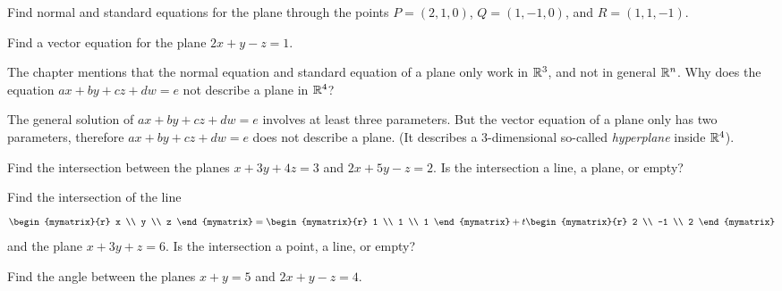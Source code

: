 \begin{ex}
  Find normal and standard equations for the plane through the points
  $P = (2,1,0)$, $Q=(1,-1,0)$, and $R=(1,1,-1)$.
\end{ex}

\begin{ex}
  Find a vector equation for the plane $2x+y-z=1$.
\end{ex}

\begin{ex}
  The chapter mentions that the normal equation and standard equation
  of a plane only work in $\mathbb{R}^3$, and not in general $\mathbb{R}^n$. Why does
  the equation $ax+by+cz+dw=e$ not describe a plane in $\mathbb{R}^4$?
  \begin{sol}
    The general solution of $ax+by+cz+dw=e$ involves at least three
    parameters.  But the vector equation of a plane only has two
    parameters, therefore $ax+by+cz+dw=e$ does not describe a
    plane. (It describes a $3$-dimensional so-called {\em
      hyperplane} inside
    $\mathbb{R}^4$).
  \end{sol}
\end{ex}

\begin{ex}
  Find the intersection between the planes $x+3y+4z=3$ and $2x+5y-z=2$.
  Is the intersection a line, a plane, or empty?
\end{ex}

\begin{ex}
  Find the intersection of the line
  \begin{equation*}
    \begin{mymatrix}{r} x \\ y \\ z \end{mymatrix}
    = \begin{mymatrix}{r} 1 \\ 1 \\ 1 \end{mymatrix}
    + t \begin{mymatrix}{r} 2 \\ -1 \\ 2 \end{mymatrix}
  \end{equation*}
  and the plane $x+3y+z = 6$.
  Is the intersection a point, a line, or empty?
\end{ex}

\begin{ex}
  Find the angle between the planes $x+y=5$ and $2x+y-z=4$.
\end{ex}

